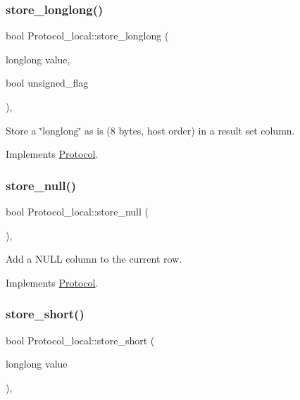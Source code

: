 \subsubsection{\texorpdfstring{store\+\_\+longlong()}{store\_longlong()}}
{\footnotesize\ttfamily bool Protocol\+\_\+local\+::store\+\_\+longlong (\begin{DoxyParamCaption}\item[{longlong}]{value,  }\item[{bool}]{unsigned\+\_\+flag }\end{DoxyParamCaption})\hspace{0.3cm}{\ttfamily [protected]}, {\ttfamily [virtual]}}

Store a \char`\"{}longlong\char`\"{} as is (8 bytes, host order) in a result set column. 

Implements \mbox{\hyperlink{classProtocol}{Protocol}}.

\mbox{\label{classProtocol__local_a91aac09fc4ccd9fa0191362a4072a824}} 
\subsubsection{\texorpdfstring{store\+\_\+null()}{store\_null()}}
{\footnotesize\ttfamily bool Protocol\+\_\+local\+::store\+\_\+null (\begin{DoxyParamCaption}{ }\end{DoxyParamCaption})\hspace{0.3cm}{\ttfamily [protected]}, {\ttfamily [virtual]}}

Add a N\+U\+LL column to the current row. 

Implements \mbox{\hyperlink{classProtocol}{Protocol}}.

\mbox{\label{classProtocol__local_a264c317143d608e94cc1bac803d46eca}} 
\subsubsection{\texorpdfstring{store\+\_\+short()}{store\_short()}}
{\footnotesize\ttfamily bool Protocol\+\_\+local\+::store\+\_\+short (\begin{DoxyParamCaption}\item[{longlong}]{value }\end{DoxyParamCaption})\hspace{0.3cm}{\ttfamily [protected]}, {\ttfamily [virtual]}}

